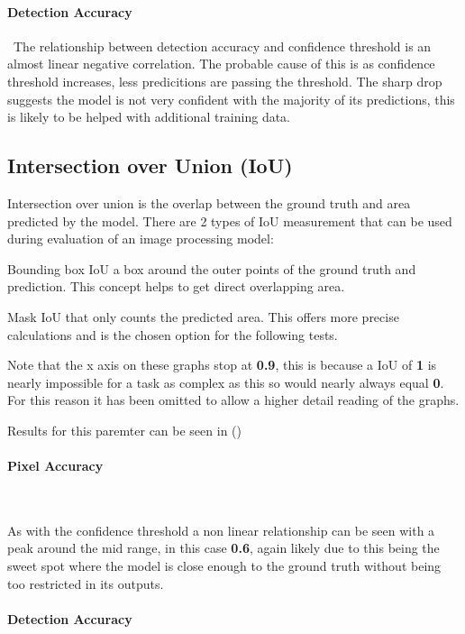 \documentclass[final]{cmpreport_02}
\begin{document}
\paragraph{Detection Accuracy} \
The relationship between detection accuracy and confidence threshold is an almost linear negative correlation.
The probable cause of this is as confidence threshold increases, less predicitions are passing the threshold.
The sharp drop suggests the model is not very confident with the majority of its predictions, this is likely to be helped with additional training data.



\subsection{Intersection over Union (IoU)}
Intersection over union is the overlap between the ground truth and area predicted by the model.
There are 2 types of IoU measurement that can be used during evaluation of an image processing model:

Bounding box IoU a box around the outer points of the ground truth and prediction.
This concept helps to get direct overlapping area.

Mask IoU that only counts the predicted area. This offers more precise calculations and is the chosen option for the following tests.

Note that the x axis on these graphs stop at \textbf{0.9}, this is because a IoU of \textbf{1} is nearly impossible for a task as complex as this so would nearly always equal \textbf{0}. For this reason it has been omitted to allow a higher detail reading of the graphs.

Results for this paremter can be seen in ()

\paragraph{Pixel Accuracy} \

As with the confidence threshold a non linear relationship can be seen with a peak around the mid range, in this case \textbf{0.6}, again likely due to this being the sweet spot where the model is close enough to the ground truth without being too restricted in its outputs.

\paragraph{Detection Accuracy} \
\end{document}
